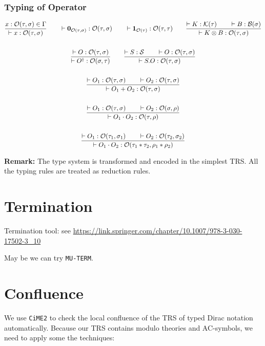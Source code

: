 \subsubsection*{Typing of Operator}
  \begin{gather*}
  \frac{x : \mathcal{O}(\tau, \sigma) \in \Gamma}{\vdash x : \mathcal{O}(\tau, \sigma)}
  \qquad
  \vdash \mathbf{0}_{\mathcal{O}(\tau, \sigma)} : \mathcal{O}(\tau, \sigma) 
  \qquad
  \vdash \textbf{1}_{\mathcal{O}(\tau)} : \mathcal{O}(\tau, \tau) 
  \qquad
  \frac{\vdash K : \mathcal{K}(\tau) \qquad \vdash B : \mathcal{B}(\sigma)}{\vdash K \otimes B : \mathcal{O}(\tau, \sigma)} \\
  \\
  \frac{\vdash O : \mathcal{O}(\tau, \sigma)}{\vdash O^\dagger : \mathcal{O}(\sigma, \tau)}
  \qquad
  \frac{\vdash S : \mathcal{S} \qquad \vdash O : \mathcal{O}(\tau, \sigma)}{\vdash S.O : \mathcal{O}(\tau, \sigma)} \\
  \\
  \frac{\vdash O_1 : \mathcal{O}(\tau, \sigma) \qquad \vdash O_2 : \mathcal{O}(\tau, \sigma)}{\vdash O_1 + O_2 : \mathcal{O}(\tau, \sigma)} \\
  \\
  \frac{\vdash O_1 : \mathcal{O}(\tau, \sigma) \qquad \vdash O_2 : \mathcal{O}(\sigma, \rho)}{\vdash O_1 \cdot O_2 : \mathcal{O}(\tau, \rho)} \\
  \\
  \frac{\vdash O_1 : \mathcal{O}(\tau_1, \sigma_1) \qquad \vdash O_2 : \mathcal{O}(\tau_2, \sigma_2)}{\vdash O_1 \cdot O_2 : \mathcal{O}(\tau_1 * \tau_2, \rho_1 * \rho_2)}
\end{gather*}

\textbf{Remark: } The type system is transformed and encoded in the simplest TRS. All the typing rules are treated as reduction rules.


\section{Termination}

Termination tool: see \url{https://link.springer.com/chapter/10.1007/978-3-030-17502-3_10}

May be we can try \texttt{MU-TERM}.


\section{Confluence}

We use \texttt{CiME2} to check the local confluence of the TRS of typed Dirac notation automatically. Because our TRS contains modulo theories and AC-symbols, we need to apply some the techniques:

